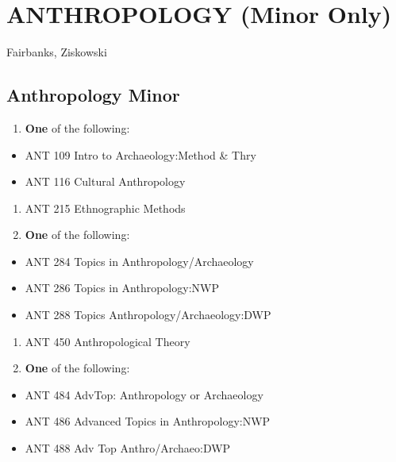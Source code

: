 \documentclass[
  letterpaper,
]{scrbook}
\providecommand{\tightlist}{%
  \setlength{\itemsep}{0pt}\setlength{\parskip}{0pt}}
\begin{document}
\hypertarget{anthropology-minor-only}{%
\section{ANTHROPOLOGY (Minor Only)}\label{anthropology-minor-only}}

Fairbanks, Ziskowski

\hypertarget{anthropology-minor}{%
\subsection{Anthropology Minor}\label{anthropology-minor}}

\begin{enumerate}
\def\labelenumi{\arabic{enumi}.}
\tightlist
\item
  \textbf{One} of the following:
\end{enumerate}

\begin{itemize}
\tightlist
\item
  ANT 109 Intro to Archaeology:Method \& Thry
\item
  ANT 116 Cultural Anthropology
\end{itemize}

\begin{enumerate}
\def\labelenumi{\arabic{enumi}.}
\setcounter{enumi}{1}
\tightlist
\item
  ANT 215 Ethnographic Methods
\item
  \textbf{One} of the following:
\end{enumerate}

\begin{itemize}
\tightlist
\item
  ANT 284 Topics in Anthropology/Archaeology
\item
  ANT 286 Topics in Anthropology:NWP
\item
  ANT 288 Topics Anthropology/Archaeology:DWP
\end{itemize}

\begin{enumerate}
\def\labelenumi{\arabic{enumi}.}
\setcounter{enumi}{3}
\tightlist
\item
  ANT 450 Anthropological Theory
\item
  \textbf{One} of the following:
\end{enumerate}

\begin{itemize}
\tightlist
\item
  ANT 484 AdvTop: Anthropology or Archaeology
\item
  ANT 486 Advanced Topics in Anthropology:NWP
\item
  ANT 488 Adv Top Anthro/Archaeo:DWP
\end{itemize}
\end{document}
